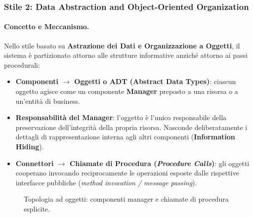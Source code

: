 \documentclass[12pt]{extarticle}
\begin{document}
\subsubsection{Stile 2: Data Abstraction and Object-Oriented Organization}

\paragraph{Concetto e Meccanismo.}
Nello stile basato su \textbf{Astrazione dei Dati e Organizzazione a Oggetti}, il sistema è partizionato attorno alle strutture informative anziché attorno ai passi procedurali:
\begin{itemize}
    \item \textbf{Componenti $\to$ Oggetti o ADT (Abstract Data Types)}: ciascun oggetto agisce come un componente \textbf{Manager} preposto a una risorsa o a un'entità di business.
    \item \textbf{Responsabilità del Manager}: l'oggetto è l'unico responsabile della preservazione dell'integrità della propria risorsa. Nasconde deliberatamente i dettagli di rappresentazione interna agli altri componenti (\textbf{Information Hiding}).
    \item \textbf{Connettori $\to$ Chiamate di Procedura (\textit{Procedure Calls})}: gli oggetti cooperano invocando reciprocamente le operazioni esposte dalle rispettive interfacce pubbliche (\textit{method invocation / message passing}).
\end{itemize}

\begin{figure}[htbp]
\centering
{}
\caption{Topologia ad oggetti: componenti manager e chiamate di procedura esplicite.}
\label{fig:oo_organization_diagram}
\end{figure}
\end{document}
